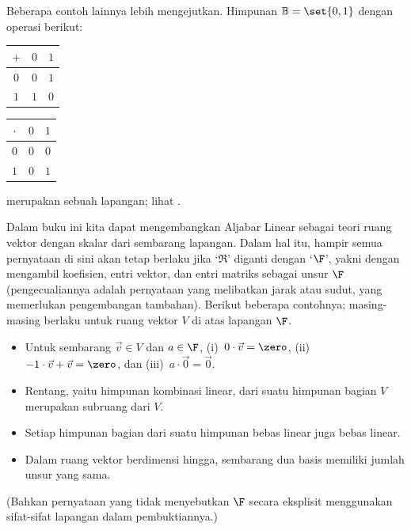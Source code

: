 Beberapa contoh lainnya lebih mengejutkan.
Himpunan \( \mathbb{B}=\set{0,1} \) dengan operasi berikut:
\par\vfill\pagebreak
\begin{center}
  \begin{tabular}{c|cc}
    \( + \) &\( 0 \) &\( 1 \) \\
    \hline
    \( 0 \) &\( 0 \) &\( 1 \) \\
    \( 1 \) &\( 1 \) &\( 0 \)
  \end{tabular}
  \qquad
  \begin{tabular}{c|cc}
    \( \cdot \) &\( 0 \) &\( 1 \) \\
     \hline
       \( 0 \)  &\( 0 \) &\( 0 \)  \\
       \( 1 \)  &\( 0 \) &\( 1 \)
  \end{tabular}
\end{center}
merupakan sebuah lapangan; lihat .

Dalam buku ini kita dapat mengembangkan Aljabar Linear sebagai teori
ruang vektor dengan skalar dari sembarang lapangan.
Dalam hal itu,
hampir semua pernyataan di sini akan tetap berlaku jika
`\( \Re \)' diganti dengan `\( \F \)', yakni dengan
mengambil koefisien, entri vektor,
dan entri matriks sebagai unsur \( \F \)
(pengecualiannya adalah pernyataan yang melibatkan jarak atau sudut,
yang memerlukan pengembangan tambahan).
Berikut beberapa contohnya; masing-masing berlaku untuk ruang vektor \( V \)
di atas lapangan \( \F \).
\begin{itemize}
  \item[$*$] Untuk sembarang \( \vec{v}\in V \) dan \( a\in\F \),
  (i)~\( 0\cdot\vec{v}=\zero \),
  (ii)~\( -1\cdot\vec{v}+\vec{v}=\zero \),
  dan (iii)~\( a\cdot\vec{0}=\vec{0} \).

  \item[$*$] Rentang, yaitu himpunan kombinasi linear, dari suatu himpunan
  bagian \( V \) merupakan subruang dari \( V \).

  \item[$*$] Setiap himpunan bagian dari suatu himpunan bebas linear juga
     bebas linear.

  \item[$*$] Dalam ruang vektor berdimensi hingga,
    sembarang dua basis memiliki jumlah unsur yang sama.
\end{itemize}
(Bahkan pernyataan yang tidak menyebutkan \( \F \) secara eksplisit
menggunakan sifat-sifat lapangan dalam pembuktiannya.)

